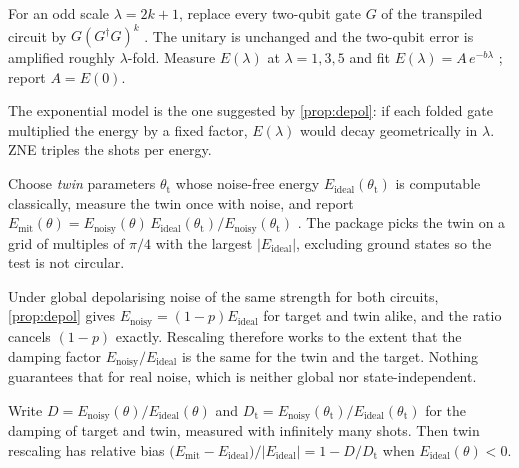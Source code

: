 \begin{dfn}\label{dfn:zne}
  For an odd scale $\lambda=2k+1$, replace every two-qubit gate $G$ of the transpiled circuit by
  $G(G^\dagger G)^k$ \parencite{giurgicatiron2020}. The unitary is unchanged and the two-qubit
  error is amplified roughly $\lambda$-fold. Measure $E(\lambda)$ at $\lambda=1,3,5$ and fit
  $E(\lambda)=A\,e^{-b\lambda}$ \parencite{endo2018}; report $A=E(0)$.
\end{dfn}

The exponential model is the one suggested by \cref{prop:depol}: if each folded gate multiplied
the energy by a fixed factor, $E(\lambda)$ would decay geometrically in $\lambda$. ZNE triples
the shots per energy.

\begin{dfn}\label{dfn:twin}
  Choose \emph{twin} parameters $\theta_{\mathrm{t}}$ whose noise-free energy
  $E_{\mathrm{ideal}}(\theta_{\mathrm{t}})$ is computable classically, measure the twin once with
  noise, and report $E_{\mathrm{mit}}(\theta)=E_{\mathrm{noisy}}(\theta)\,
  E_{\mathrm{ideal}}(\theta_{\mathrm{t}})/E_{\mathrm{noisy}}(\theta_{\mathrm{t}})$
  \parencite{urbanek2021}. The package picks the twin on a grid of multiples of $\pi/4$ with the
  largest $|E_{\mathrm{ideal}}|$, excluding ground states so the test is not circular.
\end{dfn}

\begin{rem}
  Under global depolarising noise of the same strength for both circuits, \cref{prop:depol} gives
  $E_{\mathrm{noisy}}=(1-p)E_{\mathrm{ideal}}$ for target and twin alike, and the ratio cancels
  $(1-p)$ exactly. Rescaling therefore works to the extent that the damping factor
  $E_{\mathrm{noisy}}/E_{\mathrm{ideal}}$ is the same for the twin and the target. Nothing
  guarantees that for real noise, which is neither global nor state-independent.
\end{rem}

\begin{prop}\label{prop:twinerr}
  Write $D=E_{\mathrm{noisy}}(\theta)/E_{\mathrm{ideal}}(\theta)$ and
  $D_{\mathrm t}=E_{\mathrm{noisy}}(\theta_{\mathrm t})/E_{\mathrm{ideal}}(\theta_{\mathrm t})$
  for the damping of target and twin, measured with infinitely many shots. Then twin rescaling
  has relative bias
  $\bigl(E_{\mathrm{mit}}-E_{\mathrm{ideal}}\bigr)/|E_{\mathrm{ideal}}|=1-D/D_{\mathrm t}$
  when $E_{\mathrm{ideal}}(\theta)<0$.
\end{prop}


